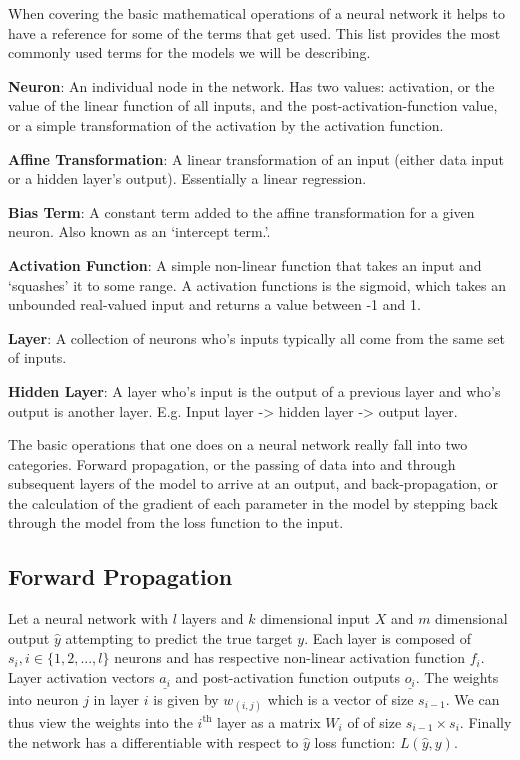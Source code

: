 \documentclass[]{book}
\theoremstyle{definition}
\theoremstyle{definition}
\theoremstyle{definition}
\theoremstyle{remark}
\begin{document}
When covering the basic mathematical operations of a neural network it
helps to have a reference for some of the terms that get used. This list
provides the most commonly used terms for the models we will be
describing.

\textbf{Neuron}: An individual node in the network. Has two values:
activation, or the value of the linear function of all inputs, and the
post-activation-function value, or a simple transformation of the
activation by the activation function.

\textbf{Affine Transformation}: A linear transformation of an input
(either data input or a hidden layer's output). Essentially a linear
regression.

\textbf{Bias Term}: A constant term added to the affine transformation
for a given neuron. Also known as an `intercept term.'.

\textbf{Activation Function}: A simple non-linear function that takes an
input and `squashes' it to some range. A activation functions is the
sigmoid, which takes an unbounded real-valued input and returns a value
between -1 and 1.

\textbf{Layer}: A collection of neurons who's inputs typically all come
from the same set of inputs.

\textbf{Hidden Layer}: A layer who's input is the output of a previous
layer and who's output is another layer. E.g. Input layer
-\textgreater{} hidden layer -\textgreater{} output layer.

The basic operations that one does on a neural network really fall into
two categories. Forward propagation, or the passing of data into and
through subsequent layers of the model to arrive at an output, and
back-propagation, or the calculation of the gradient of each parameter
in the model by stepping back through the model from the loss function
to the input.

\subsection{Forward Propagation}\label{forward-propagation}

Let a neural network with \(l\) layers and \(k\) dimensional input \(X\)
and \(m\) dimensional output \(\hat{y}\) attempting to predict the true
target \(y\). Each layer is composed of \(s_i, i \in \{1, 2, ...,l\}\)
neurons and has respective non-linear activation function \(f_i\). Layer
activation vectors \(\underline{a_i}\) and post-activation function
outputs \(\underline{o_i}\). The weights into neuron \(j\) in layer
\(i\) is given by \(w_{(i,j)}\) which is a vector of size \(s_{i -1}\).
We can thus view the weights into the \(i^{\text{th}}\) layer as a
matrix \(W_i\) of of size \(s_{i -1} \times s_i\). Finally the network
has a differentiable with respect to \(\hat{y}\) loss function:
\(L(\hat{y}, y)\).
\end{document}
